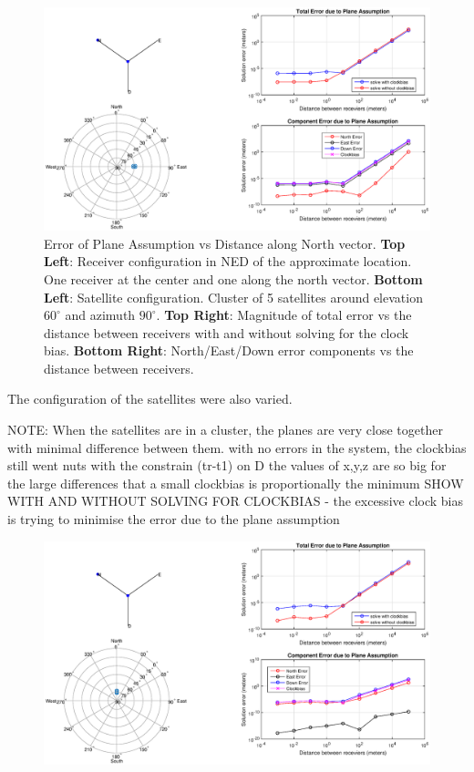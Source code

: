 \begin{figure}
\centering
\caption[Error of Plane Assumption vs Distance along North vector]{Error of Plane Assumption vs Distance along North vector. \textbf{Top Left}: Receiver configuration in NED of the approximate location. One receiver at the center and one along the north vector. \textbf{Bottom Left}: Satellite configuration. Cluster of 5 satellites around elevation $60^\circ$ and azimuth $90^\circ$. \textbf{Top Right}: Magnitude of total error vs the distance between receivers with and without solving for the clock bias. \textbf{Bottom Right}: North/East/Down error components vs the distance between receivers.}
\label{fig:plane_ALLE_north_9060}
\includegraphics[trim = 3cm 0 0 0,clip,width=\linewidth]{ChapterExperiments/Figures/plane_ALLE_north_9060}
\end{figure}



The configuration of the satellites were also varied. 

NOTE: When the satellites are in a cluster, the planes are very close together with minimal difference between them.
with no errors in the system, the clockbias still went nuts with the constrain (tr-t1) on D
the values of x,y,z are so big for the large differences that a small clockbias is proportionally the minimum
SHOW WITH AND WITHOUT SOLVING FOR CLOCKBIAS
- the excessive clock bias is trying to minimise the error due to the plane assumption



\begin{figure}
\centering
\caption{}
\label{fig:plane_ALLE_north_0075}
\includegraphics[width=0.7\linewidth]{ChapterExperiments/Figures/plane_ALLE_north_0075}
\end{figure}

